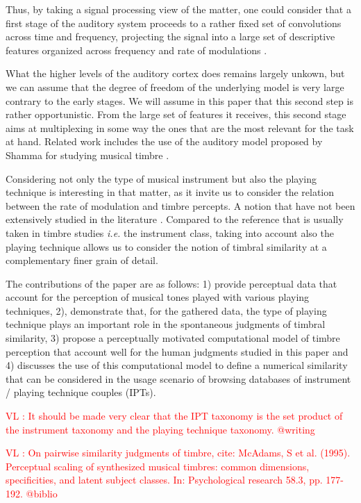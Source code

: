 \documentclass{article}
\newcommand{\ipts}{IPTs\xspace}
\newcommand{\vl}[1]{\textcolor{red}{VL : #1}}
\begin{document}
Thus, by taking a signal processing view of the matter, one could consider that a first stage of the auditory system proceeds to a rather fixed set of convolutions across time and frequency, projecting the signal into a large set of descriptive features organized across frequency and rate of modulations \cite{anden2014deep}.

What the higher levels of the auditory cortex does remains largely unkown, but we can assume that the degree of freedom of the underlying model is very large contrary to the early stages.  We will assume in this paper that this second step is rather opportunistic. From the large set of features it receives, this second stage aims at multiplexing in some way the ones that are the most relevant for the task at hand. Related work includes the use of the auditory model proposed by Shamma for studying musical timbre \cite{patil2012music}.

Considering not only the type of musical instrument but also the playing technique is interesting in that matter, as it invite us to consider the relation between the rate of modulation and timbre percepts. A notion that have not been extensively studied in the literature \cite{burred2010dynamic}. Compared to the reference that is usually taken in timbre studies \textit{i.e.} the instrument class, taking into account also the playing technique allows us to consider the notion of timbral similarity at a complementary finer grain of detail.

The contributions of the paper are as follows:
1) provide perceptual data that account for the perception of musical tones played with various playing techniques, 2), demonstrate that, for the gathered data, the type of playing technique plays an important role in the spontaneous judgments of timbral similarity, 3) propose a perceptually motivated computational model of timbre perception that account well for the human judgments studied in this paper and 4) discusses the use of this computational model to define a numerical similarity that can be considered in the usage scenario of browsing databases of instrument / playing technique couples (\ipts).

\vl{It should be made very clear that the IPT taxonomy is
the set product of the instrument taxonomy
and the playing technique taxonomy. @writing}

\vl{On pairwise similarity judgments of timbre, cite:
McAdams, S et al. (1995). Perceptual scaling of synthesized musical
timbres: common dimensions, specificities, and latent subject
classes. In: Psychological research 58.3, pp. 177-192.
@biblio}
\end{document}

